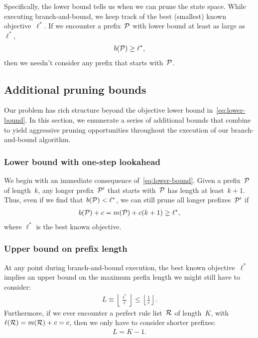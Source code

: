 Specifically, the lower bound tells us when we can prune the state space.
%
While executing branch-and-bound, we keep track of the best (smallest) known objective~$\ell^*$.
%
If we encounter a prefix~${\mathcal P}$ with lower bound at least as large as~$\ell^*$,
\begin{align}
b(\Prefix) \ge \ell^*,
\end{align}
then we needn't consider any prefix that starts with~${\mathcal P}$.

\subsection{Additional pruning bounds}

Our problem has rich structure beyond the objective lower bound in~\eqref{eq:lower-bound}.
%
In this section, we enumerate a series of additional bounds that combine to yield
aggressive pruning opportunities throughout the execution of our branch-and-bound algorithm.

\subsubsection{Lower bound with one-step lookahead}

We begin with an immediate consequence of~\eqref{eq:lower-bound}.
%
Given a prefix~${\mathcal P}$ of length~$k$, any longer prefix~${\mathcal P}'$ that starts
with~${\mathcal P}$ has length at least~${k+1}$.
%
Thus, even if we find that~${b({\mathcal P}) < \ell^*}$, we can still prune all longer
prefixes~${\mathcal P}'$ if
\begin{align}
b(\Prefix) + c = m(\Prefix) + c (k + 1) \ge \ell^*,
\end{align}
where $\ell^*$ is the best known objective.

\subsubsection{Upper bound on prefix length}

At any point during branch-and-bound execution, the best known objective~$\ell^*$
implies an upper bound on the maximum prefix length we might still have to consider:
\begin{align}
L \equiv \left\lfloor \frac{\ell^*}{c} \right\rfloor \le \left\lfloor \frac{1}{c} \right\rfloor.
\end{align}
Furthermore, if we ever encounter a perfect rule list~${\mathcal R}$ of length~$K$,
\ie with~${\ell({\mathcal R}) = m({\mathcal R}) + c = c}$, then we only have to consider shorter prefixes:
\begin{align}
L = K - 1.
\end{align}

